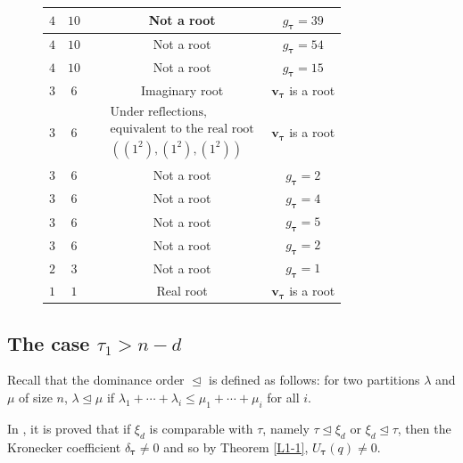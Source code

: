 \documentclass[11pt]{article}
\theoremstyle{definition}
\numberwithin{equation}{section}
\newcommand{\bv}{{\mathbf{v}}}
\newcommand{\tauhat}{{\boldsymbol \tau}}
\begin{document}
\begin{figure}[H]
\begin{tabular}{|c|c|c|c|c|}
		\hline
		$4$&$10$ & \makecell{$\substack{  (6,2^2) }$} &
		Not a root & $g_\tauhat=39$\\
		\hline
		$4$&$10$ & \makecell{$\substack{ (6,3,1) }$} &
		Not a root & $g_\tauhat=54$\\
		\hline
		$4$&$10$ & \makecell{$\substack{(6,4)}$} &
		Not a root & $g_\tauhat=15$\\
		\hline\hline
		$3$&$6$ & \makecell{$\substack{\tau_1=1,2\ \text{except}\ (2^2,1^2), (2^3)}$} &
		Imaginary root &$\bv_\tauhat$ is a root \\
		\hline
		$3$&$6$ & \makecell{$\substack{(2^2,1^2)}$} &
		$\substack{\text{Under reflections,}\\ \text{equivalent to the real root} \\ ((1^2),(1^2),(1^2)) }$ &$\bv_\tauhat$ is a root \\
		\hline
		$3$&$6$ & \makecell{$\substack{(2^3)}$} &
		Not a root &$g_\tauhat=2$ \\
		\hline
		$3$&$6$ & \makecell{$\substack{(3,1^3)}$} &
		Not a root &$g_\tauhat=4$\\
		\hline
		$3$&$6$ & \makecell{$\substack{(3,2,1)}$} &
		Not a root &$g_\tauhat=5$\\
		\hline
		$3$&$6$ & \makecell{$\substack{(3^2)}$} &
		Not a root &$g_\tauhat=2$\\
		\hline\hline
		$2$&$3$ & \makecell{$\substack{(1^3)}$} &
		Not a root &$g_\tauhat=1$\\
		\hline\hline
		$1$&$1$ & \makecell{$\substack{(1)}$} &
		Real root &$\bv_\tauhat$ is a root \\
		\hline
	\end{tabular}
\end{figure}


\subsection{The case \texorpdfstring{$\tau_1>n-d$}{tau\_1 > n-d}}

Recall that the dominance order  $\trianglelefteq$ is defined as follows: for two partitions $\lambda$ and $\mu$ of size $n$, $\lambda \trianglelefteq \mu$ if $\lambda_1+\cdots +\lambda_i \leq \mu_1+\cdots +\mu_i$ for all $i$.



In \cite{Ik}, it is proved that if $\xi_d$ is comparable with $\tau$, namely $\tau \trianglelefteq \xi_d$ or $\xi_d \trianglelefteq \tau$, then the Kronecker coefficient $\delta_\tauhat \neq 0$ and so by Theorem \ref{L1-1}, $U_\tauhat(q)\neq 0$.  
\end{document}
